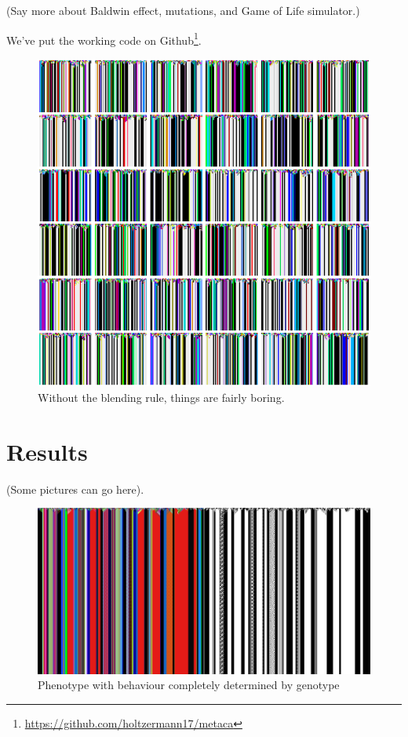 \documentclass{AISB2008}
\begin{document}
(Say more about Baldwin effect, mutations, and Game of Life
simulator.)

We've put the working code on Github\footnote{\url{https://github.com/holtzermann17/metaca}}. 


\newpage

\begin{figure}
\includegraphics[width=\columnwidth]{paint-drips.png}
\caption{Without the blending rule, things are fairly boring.}
\end{figure}
\clearpage

\section{Results}
(Some pictures can go here).

\begin{figure}
\includegraphics[width=\columnwidth]{flag.png}
\caption{Phenotype with behaviour completely determined by genotype}
\end{figure}
\end{document}
